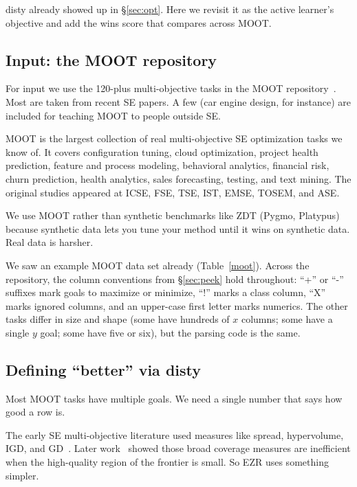 \documentclass[AMA,STIX2COL]{WileyNJDv5}
\newcommand{\IT}{{\sffamily EZR}}
\begin{document}
\textsf{disty} already showed up in \S\ref{sec:opt}. Here we
revisit it as the active learner's objective and add the
\textsf{wins} score that compares across MOOT.

\subsection{Input: the MOOT repository}

For input we use the 120-plus multi-objective tasks in the MOOT
repository~\cite{menzies2025moot}. Most are taken from recent SE
papers. A few (car engine design, for instance) are included for
teaching MOOT to people outside SE.

MOOT is the largest collection of real multi-objective SE
optimization tasks we know of. It covers configuration tuning,
cloud optimization, project health prediction, feature and
process modeling, behavioral analytics, financial risk, churn
prediction, health analytics, sales forecasting, testing, and
text mining. The original studies appeared at ICSE, FSE, TSE,
IST, EMSE, TOSEM, and ASE.

We use MOOT rather than synthetic benchmarks like ZDT (Pygmo,
Platypus) because synthetic data lets you tune your method until
it wins on synthetic data. Real data is harsher.

We saw an example MOOT data set already (Table~\ref{moot}).
Across the repository, the column conventions from
\S\ref{sec:peek} hold throughout: ``+'' or ``-'' suffixes mark
goals to maximize or minimize, ``!'' marks a class column, ``X''
marks ignored columns, and an upper-case first letter marks
numerics. The other tasks differ in size and shape (some have
hundreds of $x$ columns; some have a single $y$ goal; some have
five or six), but the parsing code is the same.

\subsection{Defining ``better'' via \textsf{disty}}

Most MOOT tasks have multiple goals. We need a single number
that says how good a row is.

The early SE multi-objective literature used measures like
spread, hypervolume, IGD, and GD~\cite{Li22}. Later
work~\cite{chen2026promisetune,ganguly2025lowgodatalightse}
showed those broad coverage measures are inefficient when the
high-quality region of the frontier is small. So \IT{} uses
something simpler.
\end{document}
